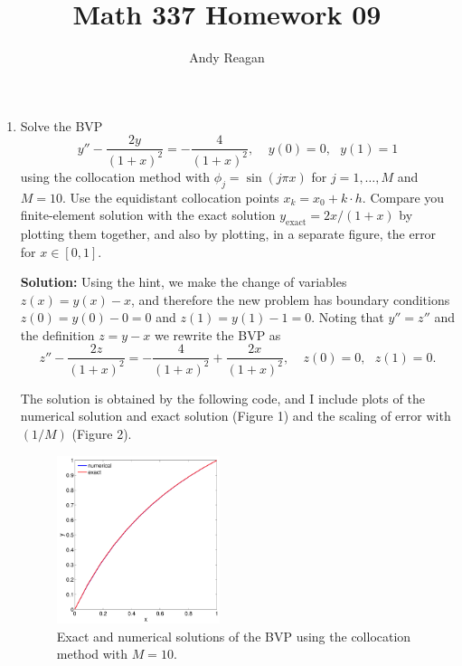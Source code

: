 \documentclass[11pt]{article}
\author{Andy Reagan}
\title{Math 337 Homework 09}
\def\f{\frac }
\begin{document}
\maketitle

\begin{enumerate}

\item Solve the BVP
\[ y'' - \f{2y}{(1+x)^2} = -\f{4}{(1+x)^2}, ~~~~~y(0)=0,~~~y(1) = 1\]
using the collocation method with $\phi _j = \sin (j\pi x)$ for $j = 1,\ldots,M$ and $M=10$.
Use the equidistant collocation points $x_k = x_0 + k\cdot h$.
Compare you finite-element solution with the exact solution $y_{\text{exact}} = 2x/(1+x)$ by plotting them together, and also by plotting, in a separate figure, the error for $x\in [0,1]$.

\bigskip
\textbf{Solution:} Using the hint, we make the change of variables $z(x) = y(x)-x$, and therefore the new problem has boundary conditions $z(0) = y(0) - 0 = 0$ and $z(1) = y(1) - 1 = 0$.
Noting that $y'' = z''$ and the definition $z = y-x$ we rewrite the BVP as
\[ z'' - \f{2z}{(1+x)^2} = -\f{4}{(1+x)^2} + \f{2x}{(1+x)^2}, ~~~~~z(0)=0,~~~z(1) = 0.\]

The solution is obtained by the following code, and I include plots of the numerical solution and exact solution (Figure 1) and the scaling of error with $(1/M)$ (Figure 2).



\begin{figure}[h!]
  \centering
    \includegraphics[width=0.45\textwidth]{andy_hw09_prb01_01.pdf}
  \caption{Exact and numerical solutions of the BVP using the collocation method with $M=10$.}
\end{figure}


\end{enumerate}
\end{document}
